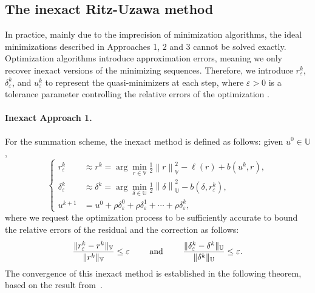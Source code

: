 \documentclass{article}
\theoremstyle{definition}
\begin{document}
\subsection{The inexact Ritz-Uzawa method} \label{subsection:practical_setup}

In practice, mainly due to the imprecision of minimization algorithms, the ideal minimizations described in Approaches 1, 2 and 3 cannot be solved exactly. Optimization algorithms introduce approximation errors, meaning we only recover inexact versions of the minimizing sequences. Therefore, we introduce $r^k_\varepsilon$, $\delta^k_\varepsilon$, and $u^k_\varepsilon$ to represent the quasi-minimizers at each step, where $\varepsilon>0$ is a tolerance parameter controlling the relative errors of the optimization \cite{brevis2022neural}.

\paragraph{Inexact Approach 1.}
For the summation scheme, the inexact method is defined as follows: given $u^0\in\mathbb U$,
\begin{equation}\label{eq:approach1_inexact}
    \left\{
    \begin{aligned}
        r^k_\varepsilon &\approx r^{k} =  \displaystyle \arg\min_{r\in \mathbb{V}}\frac{1}{2}\left\|r\right\|^2_{\mathbb{V}} - \ell(r)  + b(u^k,r),
\\[2ex]
        \delta^k_{\varepsilon} &\approx\delta^{k} =  \displaystyle\arg\min_{\delta\in \mathbb{U}}\frac{1}{2}\left\|\delta\right\|^2_{\mathbb{U}} - b(\delta,r^{k}_\varepsilon),\\[2ex]
        u^{k+1} &= u^0 + \rho \delta^0_{\varepsilon} + \rho \delta^1_{\varepsilon} + \cdots + \rho \delta^k_{\varepsilon},
    \end{aligned}
    \right.
\end{equation} 
where we request the optimization process to be sufficiently accurate to bound the relative errors of the residual and the correction as follows:
\begin{equation}\label{eq:relative1}
    {\|r^k_\varepsilon-r^k\|_\mathbb{V}\over\|r^k\|_\mathbb{V}}\leq \varepsilon \qquad\hbox{ and }\qquad
    {\|\delta^k_{\varepsilon}-\delta^k\|_\mathbb{U}\over\|\delta^k\|_\mathbb{U}}\leq \varepsilon.
\end{equation}
The convergence of this inexact method is established in the following theorem, based on the result from~\cite[Theorem~3.1]{BennyChackoBEV2025}.
\end{document}

